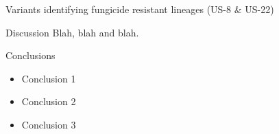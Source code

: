 \documentclass[final,t]{beamer}
\begin{document}
\begin{frame}{}
\begin{columns}[t]
\begin{column}{.28\linewidth}
\begin{block}{Variants identifying fungicide resistant lineages (US-8 \& US-22)}
  \end{block}
      
  \begin{block}{Discussion}
    Blah, blah and blah.

  \end{block}

                
      \begin{block}{Conclusions}
        \begin{itemize}
        \item Conclusion 1
        \item Conclusion 2
        \item Conclusion 3
        \end{itemize}
        \vspace{-1ex}
      \end{block}

    \end{column}
  \end{columns}
\end{frame}
\end{document}
